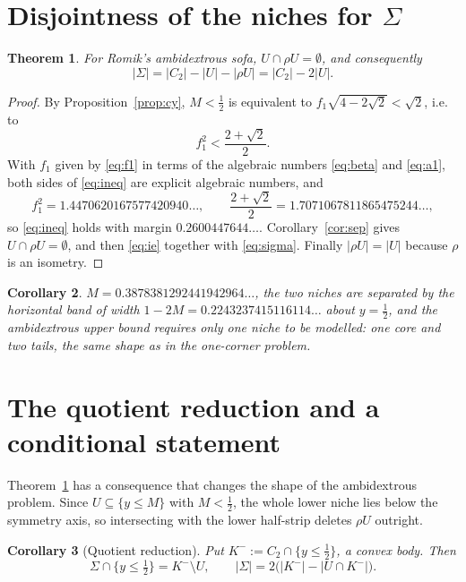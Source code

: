 \documentclass[11pt]{article}
\newtheorem{theorem}{Theorem}
\newtheorem{corollary}[theorem]{Corollary}
\theoremstyle{definition}
\newcommand{\Sig}{\Sigma}
\begin{document}
\section{Disjointness of the niches for \texorpdfstring{$\Sig$}{Sigma}}

\begin{theorem}\label{thm:main}
For Romik's ambidextrous sofa, $U\cap\rho U=\emptyset$, and consequently
\[
  |\Sig|=|C_2|-|U|-|\rho U|=|C_2|-2|U| .
\]
\end{theorem}

\begin{proof}
By Proposition~\ref{prop:cy}, $M<\tfrac12$ is equivalent to
$f_1\sqrt{4-2\sqrt2}<\sqrt2$, i.e. to
\begin{equation}\label{eq:ineq}
  f_1^2<\frac{2+\sqrt2}{2}.
\end{equation}
With $f_1$ given by \eqref{eq:f1} in terms of the algebraic numbers
\eqref{eq:beta} and \eqref{eq:a1}, both sides of \eqref{eq:ineq} are explicit
algebraic numbers, and
\[
  f_1^2=1.4470620167577420940\ldots,
  \qquad \frac{2+\sqrt2}{2}=1.7071067811865475244\ldots,
\]
so \eqref{eq:ineq} holds with margin $0.2600447644\ldots$. Corollary~\ref{cor:sep}
gives $U\cap\rho U=\emptyset$, and then \eqref{eq:ie} together with
\eqref{eq:sigma}. Finally $|\rho U|=|U|$ because $\rho$ is an isometry.
\end{proof}

\begin{corollary}
$M=0.3878381292441942964\ldots$, the two niches are separated by the horizontal
band of width $1-2M=0.2243237415116114\ldots$ about $y=\tfrac12$, and the
ambidextrous upper bound requires only \emph{one} niche to be modelled: one core
and two tails, the same shape as in the one-corner problem.
\end{corollary}

\section{The quotient reduction and a conditional statement}

Theorem~\ref{thm:main} has a consequence that changes the shape of the
ambidextrous problem. Since $U\subseteq\{y\le M\}$ with $M<\tfrac12$, the whole
lower niche lies below the symmetry axis, so intersecting with the lower
half-strip deletes $\rho U$ outright.

\begin{corollary}[Quotient reduction]\label{cor:quot}
Put $K^-:=C_2\cap\{y\le\tfrac12\}$, a convex body. Then
\[
  \Sig\cap\{y\le\tfrac12\}=K^-\setminus U,
  \qquad
  |\Sig|=2\bigl(|K^-|-|U\cap K^-|\bigr).
\]
\end{corollary}
\end{document}
